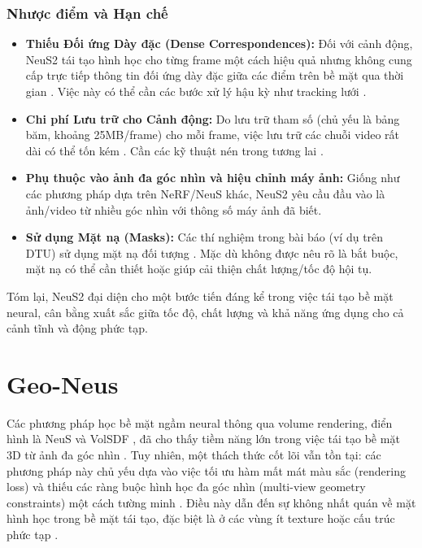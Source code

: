 \subsubsection{Nhược điểm và Hạn chế}
\begin{itemize}
    \item \textbf{Thiếu Đối ứng Dày đặc (Dense Correspondences):} Đối với cảnh động, NeuS2 tái tạo hình học cho từng frame một cách hiệu quả nhưng không cung cấp trực tiếp thông tin đối ứng dày đặc giữa các điểm trên bề mặt qua thời gian \cite{Wang2023NeuS2_source_221}. Việc này có thể cần các bước xử lý hậu kỳ như tracking lưới \cite{Wang2023NeuS2_source_222}.
    \item \textbf{Chi phí Lưu trữ cho Cảnh động:} Do lưu trữ tham số (chủ yếu là bảng băm, khoảng 25MB/frame) cho mỗi frame, việc lưu trữ các chuỗi video rất dài có thể tốn kém \cite{Wang2023NeuS2_source_232}. Cần các kỹ thuật nén trong tương lai \cite{Wang2023NeuS2_source_233}.
    \item \textbf{Phụ thuộc vào ảnh đa góc nhìn và hiệu chỉnh máy ảnh:} Giống như các phương pháp dựa trên NeRF/NeuS khác, NeuS2 yêu cầu đầu vào là ảnh/video từ nhiều góc nhìn với thông số máy ảnh đã biết.
    \item \textbf{Sử dụng Mặt nạ (Masks):} Các thí nghiệm trong bài báo (ví dụ trên DTU) sử dụng mặt nạ đối tượng \cite{Wang2023NeuS2_source_167, Wang2023NeuS2_source_349}. Mặc dù không được nêu rõ là bắt buộc, mặt nạ có thể cần thiết hoặc giúp cải thiện chất lượng/tốc độ hội tụ.
\end{itemize}

Tóm lại, NeuS2 đại diện cho một bước tiến đáng kể trong việc tái tạo bề mặt neural, cân bằng xuất sắc giữa tốc độ, chất lượng và khả năng ứng dụng cho cả cảnh tĩnh và động phức tạp.

\section{Geo-Neus}
Các phương pháp học bề mặt ngầm neural thông qua volume rendering, điển hình là NeuS \cite{Wang2021NeuS} và VolSDF \cite{Yariv2021VolSDF}, đã cho thấy tiềm năng lớn trong việc tái tạo bề mặt 3D từ ảnh đa góc nhìn \cite{Fu2022GeoNeus_source_1}. Tuy nhiên, một thách thức cốt lõi vẫn tồn tại: các phương pháp này chủ yếu dựa vào việc tối ưu hàm mất mát màu sắc (rendering loss) và thiếu các ràng buộc hình học đa góc nhìn (multi-view geometry constraints) một cách tường minh \cite{Fu2022GeoNeus_source_2, Fu2022GeoNeus_source_15, Fu2022GeoNeus_source_33}. Điều này dẫn đến sự không nhất quán về mặt hình học trong bề mặt tái tạo, đặc biệt là ở các vùng ít texture hoặc cấu trúc phức tạp \cite{Fu2022GeoNeus_source_2, Fu2022GeoNeus_source_16}.

